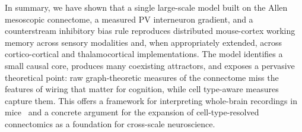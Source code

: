 \documentclass[11pt]{article}
\begin{document}
In summary, we have shown that a single large-scale model built on the Allen mesoscopic connectome, a measured PV interneuron gradient, and a counterstream inhibitory bias rule reproduces distributed mouse-cortex working memory across sensory modalities and, when appropriately extended, across cortico-cortical and thalamocortical implementations. The model identifies a small causal core, produces many coexisting attractors, and exposes a pervasive theoretical point: raw graph-theoretic measures of the connectome miss the features of wiring that matter for cognition, while cell type-aware measures capture them. This offers a framework for interpreting whole-brain recordings in mice~\cite{jun2017neuropixels,steinmetz2019distributed,stringer2019spontaneous,musall2019single} and a concrete argument for the expansion of cell-type-resolved connectomics as a foundation for cross-scale neuroscience.



\end{document}
